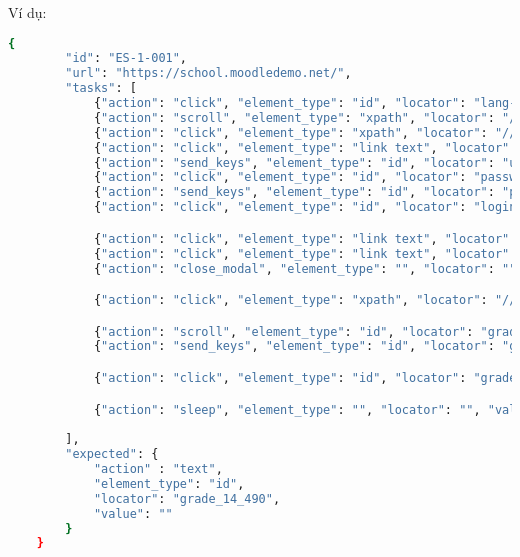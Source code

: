 Ví dụ:

\begin{lstlisting}[language=bash, caption={Ví dụ testcase  ES-1-001 ở level 2}, breaklines=true]
    {
        "id": "ES-1-001",
        "url": "https://school.moodledemo.net/",
        "tasks": [
            {"action": "click", "element_type": "id", "locator": "lang-menu-toggle", "value": null},
            {"action": "scroll", "element_type": "xpath", "locator": "//*[@id='lang-action-menu']/a[101]", "value": null},
            {"action": "click", "element_type": "xpath", "locator": "//*[@id='lang-action-menu']/a[101]", "value": null},
            {"action": "click", "element_type": "link text", "locator": "Đăng nhập", "value": null},
            {"action": "send_keys", "element_type": "id", "locator": "username", "value": "teacher"},
            {"action": "click", "element_type": "id", "locator": "password", "value": null},
            {"action": "send_keys", "element_type": "id", "locator": "password", "value": "moodle2024"},
            {"action": "click", "element_type": "id", "locator": "loginbtn", "value": null},

            {"action": "click", "element_type": "link text", "locator": "Mindful course creation", "value": null},
            {"action": "click", "element_type": "link text", "locator": "Điểm số", "value": null},
            {"action": "close_modal", "element_type": "", "locator": "", "value": null},

            {"action": "click", "element_type": "xpath", "locator": "//*[@id='usernavigation']/form", "value": null},

            {"action": "scroll", "element_type": "id", "locator": "grade_14_490", "value": null},
            {"action": "send_keys", "element_type": "id", "locator": "grade_14_490", "value": ""},

            {"action": "click", "element_type": "id", "locator": "gradersubmit", "value": null},

            {"action": "sleep", "element_type": "", "locator": "", "value": 3}
                       
        ],
        "expected": {
            "action" : "text",
            "element_type": "id",
            "locator": "grade_14_490",
            "value": ""
        }
    }
\end{lstlisting}
